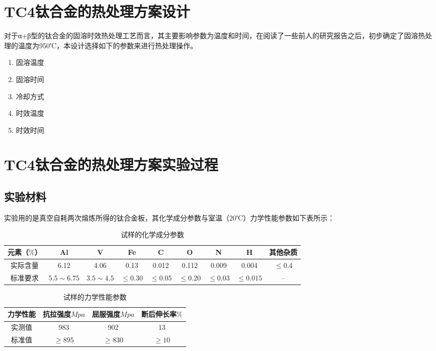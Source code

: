 
\section{TC4钛合金的热处理方案设计}
对于α+β型的\ti 钛合金的固溶时效热处理工艺而言，其主要影响参数为温度和时间，在阅读了一些前人的研究报告\cite{mirror1}\cite{mirror2}之后，初步确定了固溶热处理的温度为950℃，本设计选择如下的参数来进行热处理操作。
\begin{enumerate}
	\item 固溶温度
	\item 固溶时间
	\item 冷却方式
	\item 时效温度
	\item 时效时间
\end{enumerate}

\section{TC4钛合金的热处理方案实验过程}
\subsection{实验材料}
实验用的是真空自耗两次熔炼所得的钛合金板，其化学成分参数与室温（20℃）力学性能参数如下表所示：
\begin{table}[htbp]
	\centering
	\label{sec:mytc4chem}
	\caption{试样的化学成分参数}
	\begin{tabular}{ccccccccc}
		\toprule
	元素（$ \% $） & Al & V &Fe &C& O& N &H &其他杂质\\ \midrule
	实际含量 & 6.12&4.06 &0.13 &0.012&0.112&0.009&0.004 &$ \le 0.4 $ \\
	标准要求 &$ 5.5\sim 6.75 $ & $ 3.5\sim 4.5 $&$ \le 0.30 $ & $ \le 0.05 $&$ \le 0.20 $&$ \le 0.03$ &$ \le 0.015 $  & -- \\ \bottomrule
	\end{tabular}
\end{table}

\begin{table}[htbp]
	\centering
	\label{sec:mytc4machin}
	\caption{试样的力学性能参数}
	\begin{tabular}{cccc}
		\toprule
		力学性能& 抗拉强度$Mpa  $& 屈服强度$ Mpa $&断后伸长率$ \% $\\ \midrule
		实测值 & 983 &902 & 13\\
		标准值 &$ \ge 895 $&$ \ge 830 $&$ \ge 10 $ \\ \bottomrule
	\end{tabular}
\end{table}


